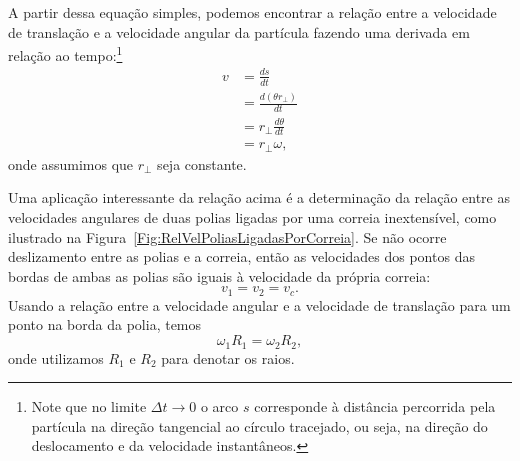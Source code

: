 A partir dessa equação simples, podemos encontrar a relação entre a velocidade de translação e a velocidade angular da partícula fazendo uma derivada em relação ao tempo:\footnote{Note que no limite $\Delta t \to 0$ o arco $s$ corresponde à distância percorrida pela partícula na direção tangencial ao círculo tracejado, ou seja, na direção do deslocamento e da velocidade instantâneos.}
\begin{align}
	v &= \frac{ds}{dt} \\
	&= \frac{d(\theta r_\perp)}{dt} \\
	&= r_\perp\frac{d\theta}{dt} \\
	&= r_\perp\omega,
\end{align}
%
onde assumimos que $r_\perp$ seja constante.


Uma aplicação interessante da relação acima é a determinação da relação entre as velocidades angulares de duas polias ligadas por uma correia inextensível, como ilustrado na Figura~\ref{Fig:RelVelPoliasLigadasPorCorreia}. Se não ocorre deslizamento entre as polias e a correia, então as velocidades dos pontos das bordas de ambas as polias são iguais à velocidade da própria correia:
\begin{equation}
    v_1 = v_2 = v_c.
\end{equation}
%
Usando a relação entre a velocidade angular e a velocidade de translação para um ponto na borda da polia, temos
\begin{equation}
    \omega_1 R_1 = \omega_2 R_2,
\end{equation}
%
onde utilizamos $R_1$ e $R_2$ para denotar os raios.

